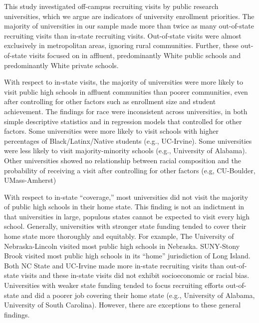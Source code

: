 \documentclass[twoside]{article}
\begin{document}
This study investigated off-campus recruiting visits by public research universities, which we argue are indicators of university enrollment priorities.  The majority of universities in our sample made more than twice as many out-of-state recruiting visits than in-state recruiting visits.  Out-of-state visits were almost exclusively in metropolitan areas, ignoring rural communities. Further, these out-of-state visits focused on in affluent, predominantly White public schools and predominantly White private schools.

With respect to in-state visits, the majority of universities were more likely to visit public high schools in affluent communities than poorer communities, even after controlling for other factors such as enrollment size and student achievement. The findings for race were inconsistent across universities, in both simple descriptive statistics and in regression models that controlled for other factors. Some universities were more likely to visit schools with higher percentages of Black/Latinx/Native students (e.g., UC-Irvine). Some universities were less likely to visit majority-minority schools (e.g., University of Alabama). Other universities showed no relationship between racial composition and the probability of receiving a visit after controlling for other factors (e.g, CU-Boulder, UMass-Amherst)

With respect to in-state ``coverage,'' most universities did not visit the majority of public high schools in their home state.  This finding is not an indictment in that universities in large, populous states cannot be expected to visit every high school. Generally, universities with stronger state funding tended to cover their home state more thoroughly and equitably. For example, The University of Nebraska-Lincoln visited most public high schools in Nebraska. SUNY-Stony Brook visited most public high schools in its ``home'' jurisdiction of Long Island. Both NC State and UC-Irvine made more in-state recruiting visits than out-of-state visits and these in-state visits did not exhibit socioeconomic or racial bias. Universities with weaker state funding tended to focus recruiting efforts out-of-state and did a poorer job covering their home state (e.g., University of Alabama, University of South Carolina). However, there are exceptions to these general findings.
\end{document}
